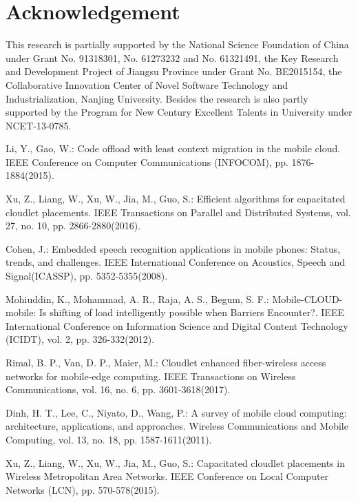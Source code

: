 \documentclass{llncs}
\begin{document}
\section*{Acknowledgement}

This research is partially supported by the National Science Foundation of China under Grant No. 91318301, No. 61273232 and No. 61321491, the Key Research and Development Project of Jiangsu Province under Grant No. BE2015154, the Collaborative Innovation Center of Novel Software Technology and Industrialization, Nanjing University. Besides the research is also partly supported by the Program for New Century Excellent Talents in University under NCET-13-0785.
%
\begin{thebibliography}{99}
%
Li, Y., Gao, W.:
Code offload with least context migration in the mobile cloud.
IEEE Conference on Computer Communications (INFOCOM), pp. 1876-1884(2015).

Xu, Z., Liang, W., Xu, W., Jia, M., Guo, S.:
Efficient algorithms for capacitated cloudlet placements.
IEEE Transactions on Parallel and Distributed Systems, vol. 27, no. 10, pp. 2866-2880(2016).

Cohen, J.:
Embedded speech recognition applications in mobile phones: Status, trends, and challenges.
IEEE International Conference on Acoustics, Speech and Signal(ICASSP), pp. 5352-5355(2008).

Mohiuddin, K., Mohammad, A. R., Raja, A. S., Begum, S. F.:
Mobile-CLOUD-mobile: Is shifting of load intelligently possible when Barriers Encounter?.
IEEE International Conference on Information Science and Digital Content Technology (ICIDT), vol. 2, pp. 326-332(2012).

Rimal, B. P., Van, D. P., Maier, M.:
Cloudlet enhanced fiber-wireless access networks for mobile-edge computing.
IEEE Transactions on Wireless Communications, vol. 16, no. 6, pp. 3601-3618(2017).

Dinh, H. T., Lee, C., Niyato, D., Wang, P.:
A survey of mobile cloud computing: architecture, applications, and approaches.
Wireless Communications and Mobile Computing, vol. 13, no. 18, pp. 1587-1611(2011).

Xu, Z., Liang, W., Xu, W., Jia, M., Guo, S.:
Capacitated cloudlet placements in Wireless Metropolitan Area Networks.
IEEE Conference on Local Computer Networks (LCN), pp. 570-578(2015).


\end{thebibliography}
\end{document}
